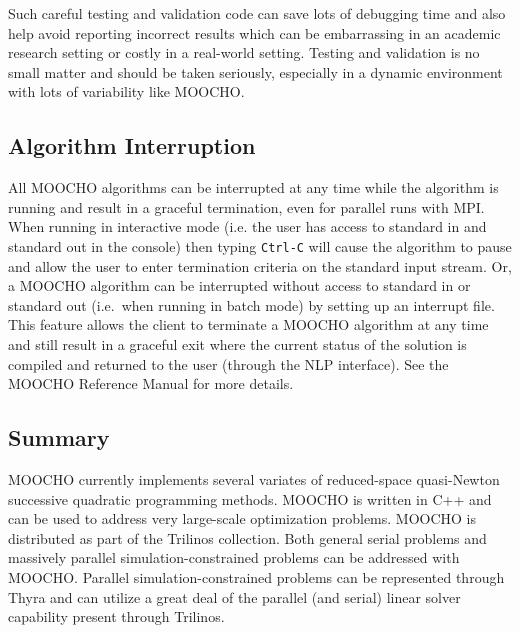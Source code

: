\documentclass[pdf,12pt,report]{SANDreport}
\begin{document}
Such careful testing and validation code can save lots of debugging time and
also help avoid reporting incorrect results which can be embarrassing in an
academic research setting or costly in a real-world setting.  Testing and
validation is no small matter and should be taken seriously, especially in a
dynamic environment with lots of variability like MOOCHO.

%
\subsection{Algorithm Interruption}
\label{moocho:sec:interruption}
%

All MOOCHO algorithms can be interrupted at any time while the algorithm is
running and result in a graceful termination, even for parallel runs with MPI.
When running in interactive mode (i.e. the user has access to standard in and
standard out in the console) then typing {}\texttt{Ctrl-C} will cause the
algorithm to pause and allow the user to enter termination criteria on the
standard input stream.  Or, a MOOCHO algorithm can be interrupted without
access to standard in or standard out (i.e.\ when running in batch mode) by
setting up an interrupt file.  This feature allows the client to terminate a
MOOCHO algorithm at any time and still result in a graceful exit where the
current status of the solution is compiled and returned to the user (through
the NLP interface).  See the MOOCHO Reference Manual
{}\cite{ref:moochorefguide} for more details.

%
\subsection{Summary}
%

MOOCHO currently implements several variates of reduced-space quasi-Newton
successive quadratic programming methods.  MOOCHO is written in C++ and can be
used to address very large-scale optimization problems.  MOOCHO is distributed
as part of the Trilinos {}\cite{ref:trilinos} collection.  Both general serial
problems and massively parallel simulation-constrained problems can be
addressed with MOOCHO.  Parallel simulation-constrained problems can be
represented through Thyra and can utilize a great deal of the parallel (and
serial) linear solver capability present through Trilinos.

%
%
\end{document}
